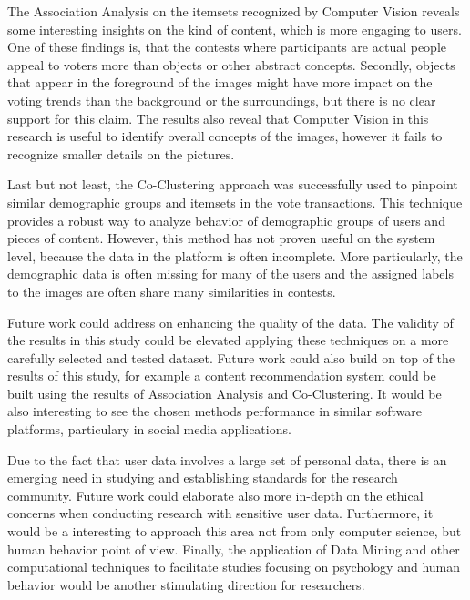 The Association Analysis on the itemsets recognized by Computer Vision reveals some interesting insights on the kind of content, which is more engaging to users. One of these findings is, that the contests where participants are actual people appeal to voters more than objects or other abstract concepts. Secondly, objects that appear in the foreground of the images might have more impact on the voting trends than the background or the surroundings, but there is no clear support for this claim. The results also reveal that Computer Vision in this research is useful to identify overall concepts of the images, however it fails to recognize smaller details on the pictures. 

Last but not least, the Co-Clustering approach was successfully used to pinpoint similar demographic groups and itemsets in the vote transactions. This technique provides a robust way to analyze behavior of demographic groups of users and pieces of content. However, this method has not proven useful on the system level, because the data in the platform is often incomplete. More particularly, the demographic data is often missing for many of the users and the assigned labels to the images are often share many similarities in contests. 

Future work could address on enhancing the quality of the data. The validity of the results in this study could be elevated applying these techniques on a more carefully selected and tested dataset. Future work could also build on top of the results of this study, for example a content recommendation system could be built using the results of Association Analysis and Co-Clustering. It would be also interesting to see the chosen methods performance in similar software platforms, particulary in social media applications. 

Due to the fact that user data involves a large set of personal data, there is an emerging need in studying and establishing standards for the research community. Future work could elaborate also more in-depth on the ethical concerns when conducting research with sensitive user data. Furthermore, it would be a interesting to approach this area not from only computer science, but human behavior point of view. Finally, the application of Data Mining and other computational techniques to facilitate studies focusing on psychology and human behavior would be another stimulating direction for researchers.